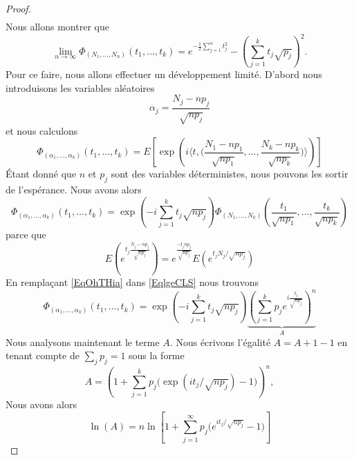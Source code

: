\begin{proof}
\begin{subequations}
\begin{align}
		\end{align}
	\end{subequations}
	Nous allons montrer que
	\begin{equation}
		\lim_{n\to \infty} \Phi_{(N_1,\ldots, N_n)}(t_1,\ldots, t_k)= e^{-\frac{ 1 }{2}\sum_{j=1}^nt_j^2}-\left( \sum_{j=1}^kt_j\sqrt{p_j} \right)^2.
	\end{equation}
	Pour ce faire, nous allons effectuer un développement limité. D'abord nous introduisons les variables aléatoires
	\begin{equation}        \label{EqmdROCD}
		\alpha_j=\frac{ N_j-np_j }{ \sqrt{np_j} }
	\end{equation}
	et nous calculons
	\begin{equation}
		\Phi_{(\alpha_1,\ldots, \alpha_k)}(t_1,\ldots, t_k)=E\left[ \exp\left( i\langle t, \big( \frac{ N_1-np_1 }{ \sqrt{np_1} },\ldots, \frac{ N_k-np_k }{ \sqrt{np_k} } \big)\rangle  \right) \right]
	\end{equation}
	Étant donné que \( n\) et \( p_j\) sont des variables déterministes, nous pouvons les sortir de l'espérance. Nous avons alors
	\begin{equation}        \label{EqlgeCLS}
		\Phi_{(\alpha_1,\ldots, \alpha_k)}(t_1,\ldots, t_k)= \exp\left( -i\sum_{j=1}^kt_j\sqrt{np_j} \right)\Phi_{(N_1,\ldots, N_k)}\left( \frac{ t_1 }{ \sqrt{np_1} },\ldots, \frac{ t_k }{ \sqrt{np_k} } \right)
	\end{equation}
	parce que
	\begin{equation}
		E\left(  e^{t_j\frac{ N_j-np_j }{ \sqrt{np_j} }} \right)= e^{\frac{ -t_jnp_j }{ \sqrt{np_j} }}E\left(  e^{t_jN_j/\sqrt{np_j}} \right)
	\end{equation}
	En remplaçant \eqref{EqOhTHia} dans \eqref{EqlgeCLS} nous trouvons
	\begin{equation}        \label{EqrUYsnD}
		\Phi_{(\alpha_1,\ldots, \alpha_k)}(t_1,\ldots, t_k)=\exp\left( -i\sum_{j=1}^kt_j\sqrt{np_j} \right)\underbrace{\left( \sum_{j=1}^kp_j e^{i\frac{ t_j }{ \sqrt{np_j} }} \right)^n}_{A}
	\end{equation}
	Nous analysons maintenant le terme $A$. Nous écrivons l'égalité \( A=A+1-1\) en tenant compte de $\sum_{j}p_j=1$ sous la forme
	\begin{equation}
		A=\left( 1+\sum_{j=1}^kp_j\big( \exp(it_j/\sqrt{np_j})-1 \big) \right)^n,
	\end{equation}
	Nous avons alors
	\begin{equation}
		\ln(A)=n\ln\left[ 1+\sum_{j=1}^{\infty}p_j\big( e^{ it_j/\sqrt{np_j}}-1) \right]

\end{equation}
\end{proof}
